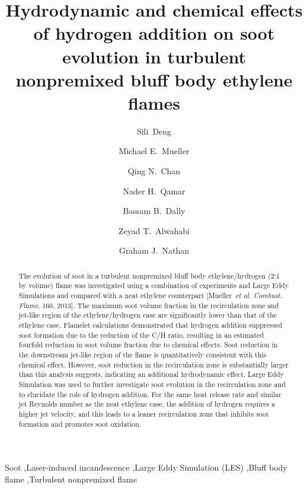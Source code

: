 \documentclass[review,3p,times]{elsarticle}
\begin{document}
\begin{frontmatter}

\title{Hydrodynamic and chemical effects of hydrogen addition on soot evolution in turbulent nonpremixed bluff body ethylene flames}

\author[Princeton]{Sili~Deng}
\author[Princeton]{Michael E.~Mueller}
\author[NSW]{Qing N.~Chan}
\author[FCT]{Nader H.~Qamar}
\author[Adelaide]{Bassam B.~Dally}
\author[Adelaide]{Zeyad T.~Alwahabi}
\author[Adelaide]{Graham J.~Nathan}

\address[Princeton]{Department of Mechanical and Aerospace Engineering, Princeton University, Princeton, USA}
\address[NSW]{School of Mechanical and Manufacturing Engineering, The University of New South Wales, Australia}
\address[FCT]{FCT-Combustion, Australia}
\address[Adelaide]{Centre for Energy Technology, The University of Adelaide, Australia}

\begin{abstract}

The evolution of soot in a turbulent nonpremixed bluff body ethylene/hydrogen (2:1 by volume) flame was investigated using a combination of experiments and Large Eddy Simulations and compared with a neat ethylene counterpart [Mueller~\emph{et al. Combust. Flame}, 160, 2013].  The maximum soot volume fraction in the recirculation zone and jet-like region of the ethylene/hydrogen case are significantly lower than that of the ethylene case.  Flamelet calculations demonstrated that hydrogen addition suppressed soot formation due to the reduction of the C/H ratio, resulting in an estimated fourfold reduction in soot volume fraction due to chemical effects.  Soot reduction in the downstream jet-like region of the flame is quantitatively consistent with this chemical effect.  However, soot reduction in the recirculation zone is substantially larger than this analysis suggests, indicating an additional hydrodynamic effect.  Large Eddy Simulation was used to further investigate soot evolution in the recirculation zone and to elucidate the role of hydrogen addition.  For the same \textcolor{Rv1}{heat release rate and similar }jet Reynolds number as the neat ethylene case, the addition of hydrogen requires a higher jet velocity, and this leads to a leaner recirculation zone that inhibits soot formation and promotes soot oxidation.

\end{abstract}

\begin{keyword} 
Soot \sep Laser-induced incandescence \sep Large Eddy Simulation (LES) \sep Bluff body flame \sep Turbulent nonpremixed flame 
\end{keyword}

\end{frontmatter}
\end{document}
